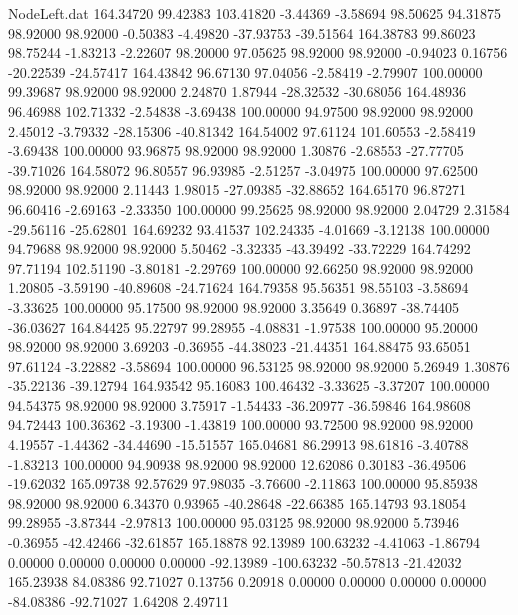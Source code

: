 \begin{filecontents}{NodeLeft.dat}
 164.34720   99.42383  103.41820    -3.44369   -3.58694   98.50625   94.31875   98.92000   98.92000   -0.50383   -4.49820  -37.93753  -39.51564
 164.38783   99.86023   98.75244    -1.83213   -2.22607   98.20000   97.05625   98.92000   98.92000   -0.94023    0.16756  -20.22539  -24.57417
 164.43842   96.67130   97.04056    -2.58419   -2.79907  100.00000   99.39687   98.92000   98.92000    2.24870    1.87944  -28.32532  -30.68056
 164.48936   96.46988  102.71332    -2.54838   -3.69438  100.00000   94.97500   98.92000   98.92000    2.45012   -3.79332  -28.15306  -40.81342
 164.54002   97.61124  101.60553    -2.58419   -3.69438  100.00000   93.96875   98.92000   98.92000    1.30876   -2.68553  -27.77705  -39.71026
 164.58072   96.80557   96.93985    -2.51257   -3.04975  100.00000   97.62500   98.92000   98.92000    2.11443    1.98015  -27.09385  -32.88652
 164.65170   96.87271   96.60416    -2.69163   -2.33350  100.00000   99.25625   98.92000   98.92000    2.04729    2.31584  -29.56116  -25.62801
 164.69232   93.41537  102.24335    -4.01669   -3.12138  100.00000   94.79688   98.92000   98.92000    5.50462   -3.32335  -43.39492  -33.72229
 164.74292   97.71194  102.51190    -3.80181   -2.29769  100.00000   92.66250   98.92000   98.92000    1.20805   -3.59190  -40.89608  -24.71624
 164.79358   95.56351   98.55103    -3.58694   -3.33625  100.00000   95.17500   98.92000   98.92000    3.35649    0.36897  -38.74405  -36.03627
 164.84425   95.22797   99.28955    -4.08831   -1.97538  100.00000   95.20000   98.92000   98.92000    3.69203   -0.36955  -44.38023  -21.44351
 164.88475   93.65051   97.61124    -3.22882   -3.58694  100.00000   96.53125   98.92000   98.92000    5.26949    1.30876  -35.22136  -39.12794
 164.93542   95.16083  100.46432    -3.33625   -3.37207  100.00000   94.54375   98.92000   98.92000    3.75917   -1.54433  -36.20977  -36.59846
 164.98608   94.72443  100.36362    -3.19300   -1.43819  100.00000   93.72500   98.92000   98.92000    4.19557   -1.44362  -34.44690  -15.51557
 165.04681   86.29913   98.61816    -3.40788   -1.83213  100.00000   94.90938   98.92000   98.92000   12.62086    0.30183  -36.49506  -19.62032
 165.09738   92.57629   97.98035    -3.76600   -2.11863  100.00000   95.85938   98.92000   98.92000    6.34370    0.93965  -40.28648  -22.66385
 165.14793   93.18054   99.28955    -3.87344   -2.97813  100.00000   95.03125   98.92000   98.92000    5.73946   -0.36955  -42.42466  -32.61857
 165.18878   92.13989  100.63232    -4.41063   -1.86794    0.00000    0.00000    0.00000    0.00000  -92.13989 -100.63232  -50.57813  -21.42032
 165.23938   84.08386   92.71027     0.13756    0.20918    0.00000    0.00000    0.00000    0.00000  -84.08386  -92.71027    1.64208    2.49711

\end{filecontents}
